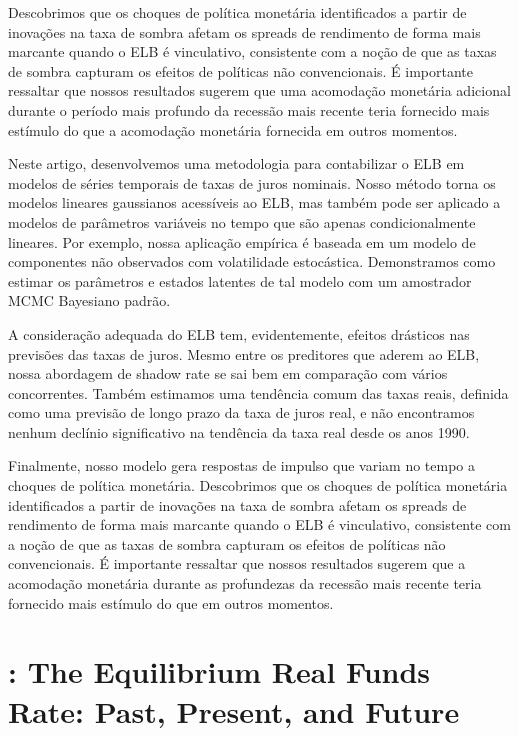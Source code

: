 Descobrimos que os choques de política monetária identificados a partir de inovações na taxa de sombra afetam os spreads de rendimento de forma mais marcante quando o ELB é vinculativo, consistente com a noção de que as taxas de sombra capturam os efeitos de políticas não convencionais. É importante ressaltar que nossos resultados sugerem que uma acomodação monetária adicional durante o período mais profundo da recessão mais recente teria fornecido mais estímulo do que a acomodação monetária fornecida em outros momentos.

Neste artigo, desenvolvemos uma metodologia para contabilizar o ELB em modelos de séries temporais de taxas de juros nominais. Nosso método torna os modelos lineares gaussianos acessíveis ao ELB, mas também pode ser aplicado a modelos de parâmetros variáveis no tempo que são apenas condicionalmente lineares. Por exemplo, nossa aplicação empírica é baseada em um modelo de componentes não observados com volatilidade estocástica. Demonstramos como estimar os parâmetros e estados latentes de tal modelo com um amostrador MCMC Bayesiano padrão.

A consideração adequada do ELB tem, evidentemente, efeitos drásticos nas previsões das taxas de juros. Mesmo entre os preditores que aderem ao ELB, nossa abordagem de shadow rate se sai bem em comparação com vários concorrentes. Também estimamos uma tendência comum das taxas reais, definida como uma previsão de longo prazo da taxa de juros real, e não encontramos nenhum declínio significativo na tendência da taxa real desde os anos 1990.

Finalmente, nosso modelo gera respostas de impulso que variam no tempo a choques de política monetária. Descobrimos que os choques de política monetária identificados a partir de inovações na taxa de sombra afetam os spreads de rendimento de forma mais marcante quando o ELB é vinculativo, consistente com a noção de que as taxas de sombra capturam os efeitos de políticas não convencionais. É importante ressaltar que nossos resultados sugerem que a acomodação monetária durante as profundezas da recessão mais recente teria fornecido mais estímulo do que em outros momentos.
%
%
\section{\citet{Hamilton:2016}: The Equilibrium Real Funds Rate: Past, Present, and Future}

